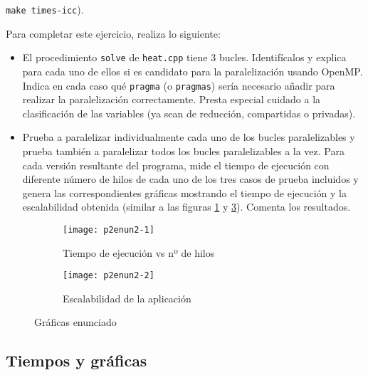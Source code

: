 \begin{ejer}
     \texttt{make times-icc}).
    \par Para completar este ejercicio, realiza lo siguiente:
    \begin{itemize}
        \item El procedimiento \texttt{solve} de \texttt{heat.cpp} tiene 3 bucles. Identifícalos y explica para cada uno
        de ellos si es candidato para la paralelización usando OpenMP. Indica en cada caso qué
        \texttt{pragma} (o \texttt{pragmas}) sería necesario añadir para realizar la paralelización correctamente.
        Presta especial cuidado a la clasificación de las variables (ya sean de reducción, compartidas
        o privadas).
        \item Prueba a paralelizar individualmente cada uno de los bucles paralelizables y prueba también a
        paralelizar todos los bucles paralelizables a la vez. Para cada versión resultante del programa,
        mide el tiempo de ejecución con diferente número de hilos de cada uno de los tres casos de
        prueba incluidos y genera las correspondientes gráficas mostrando el tiempo de ejecución y
        la escalabilidad obtenida (similar a las figuras \ref{fig:p2enun2-1} y \ref{fig:p2enun2-2}). Comenta los resultados.
    \end{itemize}
\end{ejer}
\begin{figure}
    \centering
    \begin{subfigure}{0.4\textwidth}
        \texttt{[image: p2enun2-1]}
        \caption{Tiempo de ejecución vs nº de hilos}
        \label{fig:p2enun2-1}
    \end{subfigure}
    \begin{subfigure}{0.4\textwidth}
        \texttt{[image: p2enun2-2]}
        \caption{Escalabilidad de la aplicación}
        \label{fig:p2enun2-2}
    \end{subfigure}
    \caption{Gráficas enunciado}
\end{figure}

\subsection{Tiempos y gráficas}







